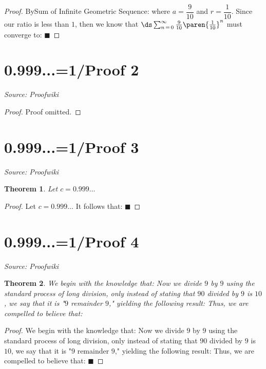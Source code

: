 \documentclass{article}
\newtheorem{theorem}{Theorem}
\begin{document}
\begin{proof}
BySum of Infinite Geometric Sequence: where $a = \dfrac 9 {10}$ and $r = \dfrac 1 {10}$. Since our ratio is less than $1$, then we know that $\ds \sum_{n \mathop = 0}^\infty \frac 9 {10} \paren {\frac 1 {10} }^n$ must converge to: $\blacksquare$
\end{proof}

\newpage

\section{0.999...=1/Proof 2}
\textit{Source: Proofwiki}

\begin{proof}
Proof omitted.
\end{proof}

\newpage

\section{0.999...=1/Proof 3}
\textit{Source: Proofwiki}

\begin{theorem}
Let  $c = 0.999 \ldots$
\end{theorem}

\begin{proof}
Let  $c = 0.999 \ldots$ It follows that: $\blacksquare$
\end{proof}

\newpage

\section{0.999...=1/Proof 4}
\textit{Source: Proofwiki}

\begin{theorem}
We begin with the knowledge that: Now we divide $9$ by $9$ using the standard process of long division, only instead of stating that $90$ divided by $9$ is $10$, we say that it is "$9$ remainder $9$," yielding the following result: Thus, we are compelled to believe that:
\end{theorem}

\begin{proof}
We begin with the knowledge that: Now we divide $9$ by $9$ using the standard process of long division, only instead of stating that $90$ divided by $9$ is $10$, we say that it is "$9$ remainder $9$," yielding the following result: Thus, we are compelled to believe that: $\blacksquare$
\end{proof}
\end{document}
